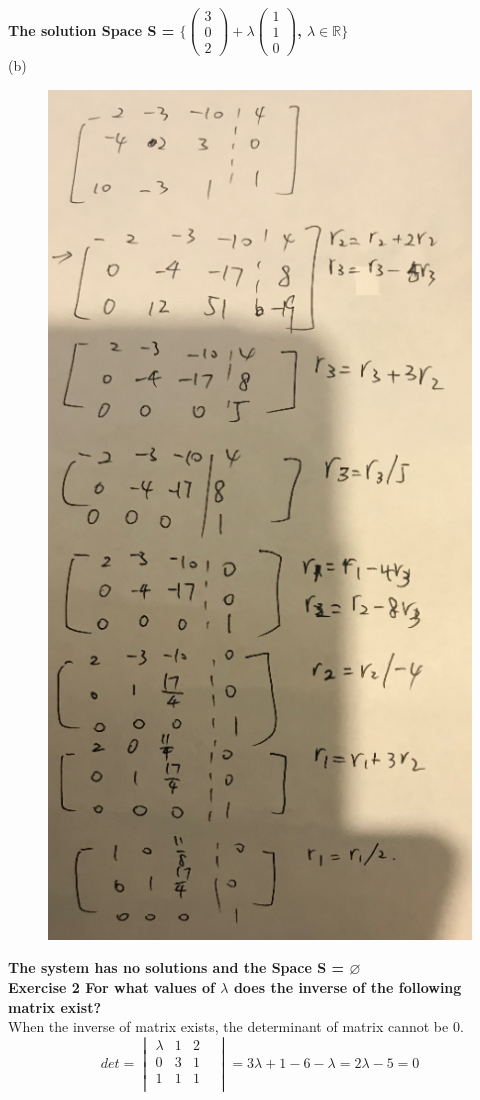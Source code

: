\documentclass{article}
\let\emptyset\varnothing
\begin{document}
\textbf{The solution Space S = $\Bigg\{\begin{pmatrix}
	3\\0\\2
\end{pmatrix} + \lambda \begin{pmatrix}
	1\\1\\0
\end{pmatrix} $, $\lambda \in \mathbb{R}\Bigg\}$\\}
(b)

\begin{figure}[H]
  \includegraphics[width = 0.66\linewidth] {1b.JPG}
\end{figure}
\textbf{The system has no solutions and the Space S = $\emptyset$}\\


\textbf{Exercise 2 For what values of $\lambda$ does the inverse of the following matrix exist?}\\
When the inverse of matrix exists, the determinant of matrix cannot be 0.
\[
det =
\begin{vmatrix}
 \lambda & 1 & 2 & \\ 
 0 & 3 & 1\\
 1 & 1 & 1\\
\end{vmatrix} = 3\lambda+1-6-\lambda = 2\lambda -5 = 0
\]
\end{document}
